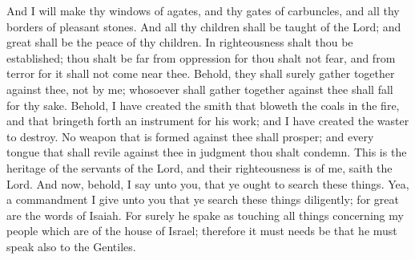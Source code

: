 And I will make thy windows of agates, and thy gates of carbuncles, and all thy borders of pleasant stones.
\bverse \iffalse And all thy children shall be taught of the Lord; and great shall be the peace of thy children. \fi
And all thy children shall be taught of the Lord; and great shall be the peace of thy children.
\bverse \iffalse In righteousness shalt thou be established; thou shalt be far from oppression for thou shalt not fear, and from terror for it shall not come near thee. \fi
In righteousness shalt thou be established; thou shalt be far from oppression for thou shalt not fear, and from terror for it shall not come near thee.
\bverse \iffalse Behold, they shall surely gather together against thee, not by me; whosoever shall gather together against thee shall fall for thy sake. \fi
Behold, they shall surely gather together against thee, not by me; whosoever shall gather together against thee shall fall for thy sake.
\bverse \iffalse Behold, I have created the smith that bloweth the coals in the fire, and that bringeth forth an instrument for his work; and I have created the waster to destroy. \fi
Behold, I have created the smith that bloweth the coals in the fire, and that bringeth forth an instrument for his work; and I have created the waster to destroy.
\bverse \iffalse No weapon that is formed against thee shall prosper; and every tongue that shall revile against thee in judgment thou shalt condemn. This is the heritage of the servants of the Lord, and their righteousness is of me, saith the Lord. \fi
No weapon that is formed against thee shall prosper; and every tongue that shall revile against thee in judgment thou shalt condemn. This is the heritage of the servants of the Lord, and their righteousness is of me, saith the Lord.
\bchapter
\bverse \iffalse And now, behold, I say unto you, that ye ought to search these things. Yea, a commandment I give unto you that ye search these things diligently; for great are the words of Isaiah. \fi
And now, behold, I say unto you, that ye ought to search these things. Yea, a commandment I give unto you that ye search these things diligently; for great are the words of Isaiah.
\bverse \iffalse For surely he spake as touching all things concerning my people which are of the house of Israel; therefore it must needs be that he must speak also to the Gentiles. \fi
For surely he spake as touching all things concerning my people which are of the house of Israel; therefore it must needs be that he must speak also to the Gentiles.
